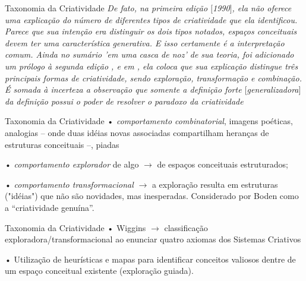\documentclass[aspectratio=169]{beamer}
\begin{document}
\begin{frame}{Taxonomia da Criatividade}
\emph{De fato, na primeira edição $[$1990$]$, ela não oferece uma explicação do número de diferentes tipos de criatividade que ela identificou. Parece que sua intenção era distinguir os dois tipos notados, espaços conceituais devem ter uma característica generativa. E isso certamente é a interpretação comum. Ainda no sumário 'em uma casca de noz' de sua teoria, foi adicionado um prólogo à segunda edição \cite{boden_creative_1990}, e em , ela coloca que sua explicação distingue três principais formas de criatividade, sendo exploração, transformação e \emph{combinação}. É somada à incerteza a observação que somente a definição forte $[$generalizadora$]$ da definição possui o poder de resolver o paradoxo da criatividade}
\end{frame}

\begin{frame}{Taxonomia da Criatividade}
• \emph{comportamento combinatorial}, imagens poéticas, analogias -- onde duas idéias novas associadas compartilham heranças de estruturas conceituais --, piadas \cite[p.~348]{boden_creativity_1998}

• \emph{comportamento explorador} de algo $\rightarrow$ de espaços conceituais estruturados;

• \emph{comportamento transformacional} $\rightarrow$ a exploração resulta em estruturas ("idéias") que não são novidades, mas inesperadas. Considerado por Boden como a ``criatividade genuína''.
\end{frame}

\newcommand{\pressingthree}[3]{$\mathcal{#1}'^{#3}_{#2}$} 

\begin{frame}{Taxonomia da Criatividade}
• Wiggins $\rightarrow$ classificação exploradora/transformacional ao enunciar quatro axiomas dos Sistemas Criativos  

• Utilização de heurísticas e mapas para identificar conceitos valiosos dentre de um espaço conceitual existente (exploração guiada). 
\end{frame}
\end{document}
